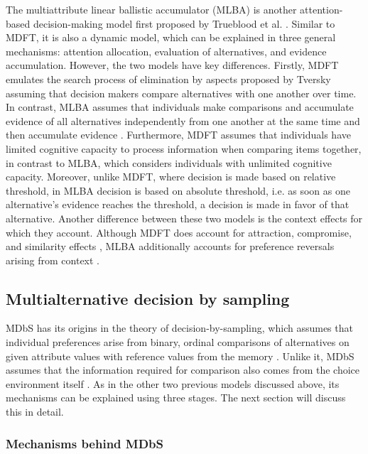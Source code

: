 \documentclass[a4paper,12pt]{article}
\newcommand{\citeyearonly}[1]{\citeyearpar{#1}}
\begin{document}
The multiattribute linear ballistic accumulator (MLBA) is another attention-based decision-making model first proposed by Trueblood et al. \citeyearonly{trueblood2014multiattribute}. Similar to MDFT, it is also a dynamic model, which can be explained in three general mechanisms: attention allocation, evaluation of alternatives, and evidence accumulation. However, the two models have key differences. Firstly, MDFT emulates the search process of elimination by aspects proposed by Tversky \citeyearonly{tversky1972elimination} assuming that decision makers compare alternatives with one another over time. In contrast, MLBA assumes that individuals make comparisons and accumulate evidence of all alternatives independently from one another at the same time and then accumulate evidence \citep{trueblood15fragile}. Furthermore, MDFT assumes that individuals have limited cognitive capacity to process information when comparing items together, in contrast to MLBA, which considers individuals with unlimited cognitive capacity. Moreover, unlike MDFT, where decision is made based on relative threshold, in MLBA decision is based on absolute threshold, i.e. as soon as one alternative's evidence reaches the threshold, a decision is made in favor of that alternative. Another difference between these two models is the context effects for which they account. Although MDFT does account for attraction, compromise, and similarity effects \citep{hotaling2019quantitative}, MLBA additionally accounts for preference reversals arising from context \citep{trueblood15fragile}. 


\subsection{Multialternative decision by sampling}

MDbS has its origins in the theory of decision-by-sampling, which assumes that individual preferences arise from binary, ordinal comparisons of alternatives on given attribute values with reference values from the memory \citep{stewart2006decision}. Unlike it, MDbS assumes that the information required for comparison also comes from the choice environment itself \citep{noguchi2018multialternative}. As in the other two previous models discussed above, its mechanisms can be explained using three stages. The next section will discuss this in detail.

\subsubsection{Mechanisms behind MDbS} \label{subsec:mechanismMDBS}
\end{document}
